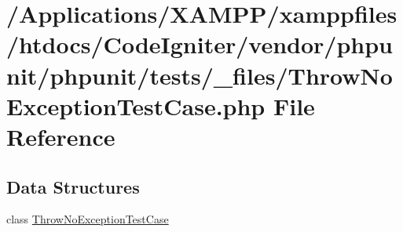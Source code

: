 \hypertarget{_throw_no_exception_test_case_8php}{}\section{/\+Applications/\+X\+A\+M\+P\+P/xamppfiles/htdocs/\+Code\+Igniter/vendor/phpunit/phpunit/tests/\+\_\+files/\+Throw\+No\+Exception\+Test\+Case.php File Reference}
\label{_throw_no_exception_test_case_8php}
\subsection*{Data Structures}
\begin{DoxyCompactItemize}
\item 
class \mbox{\hyperlink{class_throw_no_exception_test_case}{Throw\+No\+Exception\+Test\+Case}}
\end{DoxyCompactItemize}
